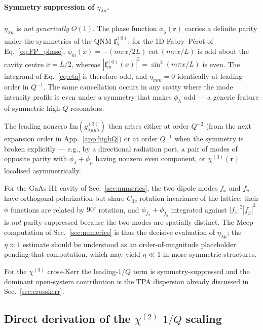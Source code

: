 \documentclass[12pt]{article}
\begin{document}
\paragraph{Symmetry suppression of $\eta_{\lambda\mu}$.}
$\eta_{\lambda\mu}$ is \emph{not generically} $O(1)$.  The phase
function $\phi_\lambda(\mathbf{r})$ carries a definite parity under
the symmetries of the QNM $\mathbf{f}^{(0)}_\lambda$: for the 1D
Fabry--P\'erot of Eq.~\eqref{eq:FP_phase},
$\phi_m(x)=-(m\pi x/2L)\cot(m\pi x/L)$ is odd about the cavity centre
$x=L/2$, whereas $|\mathbf{f}^{(0)}_m(x)|^2=\sin^2(m\pi x/L)$ is even.
The integrand of Eq.~\eqref{eq:eta} is therefore odd, and
$\eta_{mm}=0$ identically at leading order in $Q^{-1}$.  The same
cancellation occurs in any cavity where the mode intensity profile is
even under a symmetry that makes $\phi_\lambda$ odd --- a generic
feature of symmetric high-$Q$ resonators.

The leading nonzero $\mathrm{Im}(g^{(3)}_{\lambda\mu\mu\lambda})$ then
arises either at order $Q^{-2}$ (from the next expansion order in
App.~\ref{app:highQ}) or at order $Q^{-1}$ when the symmetry is broken
explicitly --- e.g., by a directional radiation port, a pair of modes
of opposite parity with $\phi_\lambda+\phi_\mu$ having nonzero even
component, or $\chi^{(3)}(\mathbf{r})$ localised asymmetrically.

For the GaAs H1 cavity of Sec.~\ref{sec:numerics}, the two dipole modes
$f_x$ and $f_y$ have orthogonal polarization but share $C_{3v}$ rotation
invariance of the lattice; their $\phi$ functions are related by
$90^\circ$ rotation, and $\phi_{f_x}+\phi_{f_y}$ integrated against
$|f_x|^2|f_y|^2$ is \emph{not} parity-suppressed because the two modes
are spatially distinct.  The Meep computation of
Sec.~\ref{sec:numerics} is thus the decisive evaluation of
$\eta_{\lambda\mu}$; the $\eta\approx 1$ estimate should be understood
as an order-of-magnitude placeholder pending that computation, which
may yield $\eta\ll 1$ in more symmetric structures.

For the $\chi^{(3)}$ cross-Kerr the leading-$1/Q$ term is
symmetry-suppressed and the dominant open-system contribution is the
TPA dispersion already discussed in Sec.~\ref{sec:crosskerr}.

\subsection*{Direct derivation of the $\chi^{(2)}$ $1/Q$ scaling}
\label{app:chi2_derivation}
\end{document}
